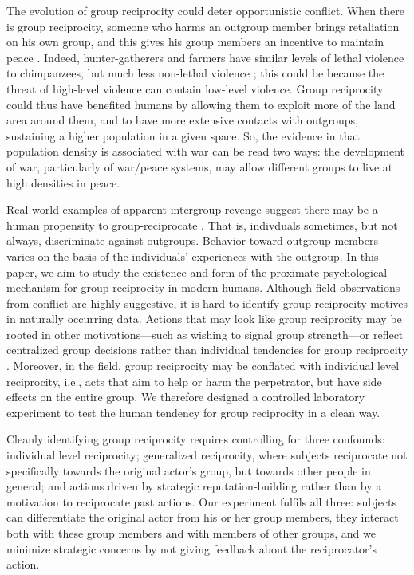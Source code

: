 \documentclass[12pt,a4paper]{article}\usepackage[]{graphicx}\usepackage[]{color}
\begin{document}
The evolution of group 
reciprocity could deter opportunistic conflict. When there is group reciprocity, someone who harms an outgroup member 
brings retaliation on his own group, and this gives his group members an incentive to maintain peace 
\citep{boehm1984blood,fearon1996explaining}. Indeed, hunter-gatherers and farmers have similar levels of
lethal violence to chimpanzees, but much less non-lethal violence \citep{wrangham2006comparative}; this could be
because the threat of high-level violence can contain low-level violence. Group reciprocity could thus 
have benefited humans by allowing them to exploit more of the land area 
around them, and to have more extensive contacts with outgroups, sustaining
a higher population in a given space. So, the evidence in \citet{kelly2000warless} that population 
density is associated with war can be read two ways: the development of war, particularly of war/peace systems, may 
allow different groups to live at high densities in peace.  

Real world examples of apparent intergroup revenge suggest there may be a human propensity to group-reciprocate \citep{horowitz1985ethnicgroups,horowitz2001thedeadly,bauerlein2001negrophobia,chagnon1988lifehistories}.
That is, indivduals sometimes, but not always, discriminate against outgroups. Behavior toward outgroup members varies on the basis of the individuals' experiences with the outgroup.
In this paper, we aim to study the existence and form of the proximate
psychological mechanism for group reciprocity in modern humans. Although field observations from conflict are highly 
suggestive, it is hard to identify group-reciprocity motives in naturally occurring data. Actions that may look like group reciprocity may be rooted in other motivations---such as wishing to signal group strength---or reflect centralized group decisions rather than individual tendencies for group reciprocity \citep{gould2000revenge,mamdani2001victims}.
Moreover, in the field, group 
reciprocity may be conflated with individual level reciprocity, i.e., acts that aim to help or harm the perpetrator, but have side effects on the entire group. We therefore designed a controlled laboratory experiment to test the human tendency for group reciprocity in a clean way. 

Cleanly identifying group reciprocity requires controlling for three confounds: individual level reciprocity; generalized reciprocity,
where subjects reciprocate not specifically towards the original actor’s group, but towards other people in general; and
actions driven by strategic reputation-building rather than by a motivation to reciprocate past actions. 
Our experiment fulfils all three: subjects can differentiate the original actor from his or her group members, they 
interact both with these group members and with members of other groups, and we minimize strategic concerns by not giving feedback about the reciprocator's action.
\end{document}
